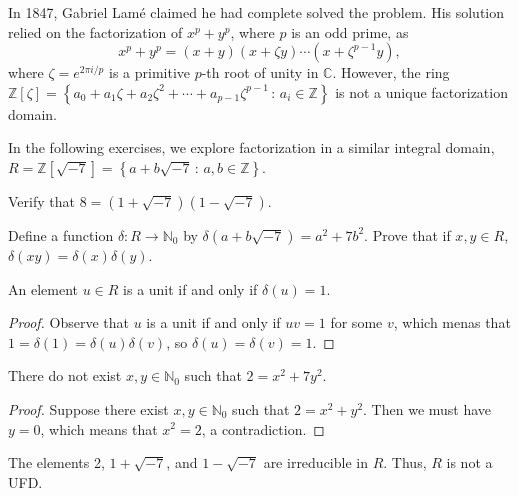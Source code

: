 \documentclass[english,course]{lecture}
\theoremstyle{plain}
\def\setof#1#2{{\left\{#1\,\colon\,#2\right\}}}
\def\C{{\mathbb C}}
\def\Z{{\mathbb Z}}
\def\N{{\mathbb N}}
\def\presnotes{}
\begin{document}
In 1847, Gabriel Lam\'{e} claimed he had complete solved the problem. His solution relied on the factorization of $x^p + y^p$, where $p$ is an odd prime, as
\[
	x^p + y^p = (x+y)(x+\zeta y) \cdots (x+\zeta^{p-1}y),
\]
where $\zeta = e^{2\pi i/p}$ is a primitive $p$-th root of unity in $\C$.
However, the ring $\Z[\zeta] = \setof{a_0 + a_1 \zeta + a_2 \zeta^2 + \cdots + a_{p-1} \zeta^{p-1}}{a_i\in\Z}$ is not a unique factorization domain.

In the following exercises, we explore factorization in a similar integral domain, $R = \Z[\sqrt{-7}] = \setof{a+b\sqrt{-7}}{a,b\in\Z}$.



\begin{exer}
	Verify that $8 = (1+\sqrt{-7})(1-\sqrt{-7})$.
\end{exer}

\presnotes

\begin{exer}
	Define a function $\delta : R \to \N_0$ by $\delta(a+b\sqrt{-7}) = a^2 + 7 b^2$.
	Prove that if $x,y\in R$, $\delta(xy) = \delta(x)\delta(y)$.
\end{exer}

\presnotes

\begin{theorem}
	An element $u\in R$ is a unit if and only if $\delta(u) = 1$.
\end{theorem}

\begin{proof}
	Observe that $u$ is a unit if and only if $uv = 1$ for some $v$, which menas that $1 = \delta(1) = \delta(u) \delta(v)$, so $\delta(u) = \delta(v) = 1$.
\end{proof}

\presnotes

\begin{lemma}
	There do not exist $x,y\in \N_0$ such that $2 = x^2 + 7y^2$.
\end{lemma}

\begin{proof}
	Suppose there exist $x,y\in \N_0$ such that $2 = x^2 + y^2$.
	Then we must have $y = 0$, which means that $x^2 = 2$, a contradiction.
\end{proof}

\presnotes

\begin{theorem}
	The elements 2, $1+ \sqrt{-7}$, and $1-\sqrt{-7}$ are irreducible in $R$.
	Thus, $R$ is not a UFD.
\end{theorem}
\end{document}
